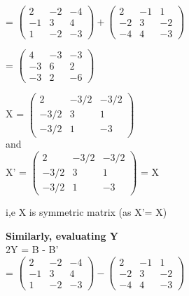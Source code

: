 \documentclass[a4paper,12pt]{article}
\begin{document}
 \hspace*{0.5cm}=  $\begin{pmatrix}2 & -2 & -4 \\-1 & 3 & 4 \\1 & -2 & -3\end{pmatrix} + \begin{pmatrix}2 & -1 & 1 \\-2 & 3 & -2 \\-4& 4& -3\end{pmatrix}$\\

\hspace*{1cm}

\hspace*{0.5cm}= $\begin{pmatrix}4 & -3 & -3 \\-3 & 6 & 2 \\-3 & 2 & -6\end{pmatrix}$\\

\hspace*{1cm}

 X = $\begin{pmatrix}2 & -3/2 & -3/2 \\-3/2 & 3 & 1 \\-3/2 & 1 & -3\end{pmatrix}$\\

and\\

 X' = $\begin{pmatrix}2 & -3/2 & -3/2 \\-3/2 & 3 & 1 \\-3/2 & 1 & -3\end{pmatrix}$ = X
 
\vspace*{1cm}
 
i,e X is symmetric matrix \hspace*{3cm}(as X'= X)\\

\hspace*{0.5cm}

\textbf{Similarly, evaluating Y}\\

2Y = B - B'\\

\hspace*{0.5cm}=  $\begin{pmatrix}2 & -2 & -4 \\-1 & 3 & 4 \\1 & -2 & -3\end{pmatrix} - \begin{pmatrix}2 & -1 & 1 \\-2 & 3 & -2 \\-4& 4& -3\end{pmatrix}$\\
\end{document}
